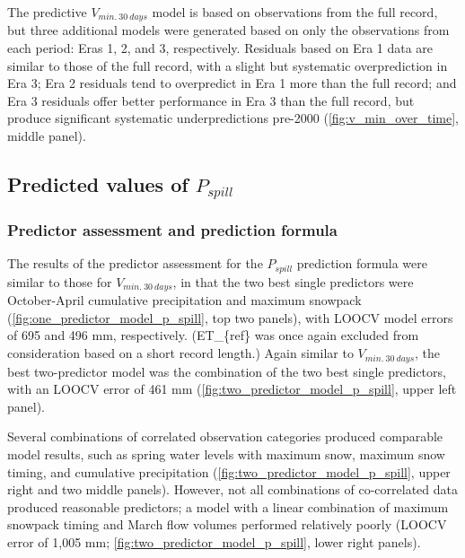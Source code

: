 \documentclass[
]{article}
\begin{document}
The predictive \(V_{min.~30~days}\) model is based on observations from
the full record, but three additional models were generated based on
only the observations from each period: Eras 1, 2, and 3, respectively.
Residuals based on Era 1 data are similar to those of the full record,
with a slight but systematic overprediction in Era 3; Era 2 residuals
tend to overpredict in Era 1 more than the full record; and Era 3
residuals offer better performance in Era 3 than the full record, but
produce significant systematic underpredictions pre-2000
(\autoref{fig:v_min_over_time}, middle panel).

\hypertarget{predicted-values-of-p_spill}{%
\subsection{\texorpdfstring{Predicted values of
\(P_{spill}\)}{Predicted values of P\_\{spill\}}}\label{predicted-values-of-p_spill}}

\hypertarget{predictor-assessment-and-prediction-formula-1}{%
\subsubsection{Predictor assessment and prediction
formula}\label{predictor-assessment-and-prediction-formula-1}}

The results of the predictor assessment for the \(P_{spill}\) prediction
formula were similar to those for \(V_{min.~30~days}\), in that the two
best single predictors were October-April cumulative precipitation and
maximum snowpack (\autoref{fig:one_predictor_model_p_spill}, top two
panels), with LOOCV model errors of 695 and 496 mm, respectively.
(ET\_\{ref\} was once again excluded from consideration based on a short
record length.) Again similar to \(V_{min.~30~days}\), the best
two-predictor model was the combination of the two best single
predictors, with an LOOCV error of 461 mm
(\autoref{fig:two_predictor_model_p_spill}, upper left panel).

Several combinations of correlated observation categories produced
comparable model results, such as spring water levels with maximum snow,
maximum snow timing, and cumulative precipitation
(\autoref{fig:two_predictor_model_p_spill}, upper right and two middle
panels). However, not all combinations of co-correlated data produced
reasonable predictors; a model with a linear combination of maximum
snowpack timing and March flow volumes performed relatively poorly
(LOOCV error of 1,005 mm; \autoref{fig:two_predictor_model_p_spill},
lower right panels).
\end{document}
